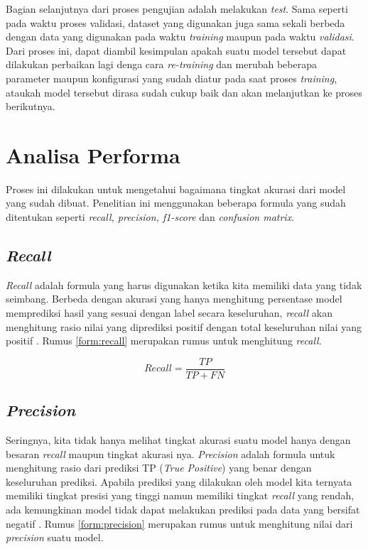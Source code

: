 Bagian selanjutnya dari proses pengujian adalah melakukan \textit{test}. Sama seperti pada waktu proses validasi, dataset yang digunakan juga sama sekali berbeda dengan data yang digunakan pada waktu \textit{training} maupun pada waktu \textit{validasi}. Dari proses ini, dapat diambil kesimpulan apakah suatu model tersebut dapat dilakukan perbaikan lagi denga cara \textit{re-training} dan merubah beberapa parameter maupun konfigurasi yang sudah diatur pada saat proses \textit{training}, ataukah model tersebut dirasa sudah cukup baik dan akan melanjutkan ke proses berikutnya.

\section{Analisa Performa}
Proses ini dilakukan untuk mengetahui bagaimana tingkat akurasi dari model yang sudah dibuat. Penelitian ini menggunakan beberapa formula yang sudah ditentukan seperti \textit{recall, precision, f1-score} dan \textit{confusion matrix}.

\subsection{\textit{Recall}}

\textit{Recall} adalah formula yang harus digunakan ketika kita memiliki data yang tidak seimbang. Berbeda dengan akurasi yang hanya menghitung persentase model memprediksi hasil yang sesuai dengan label secara keseluruhan, \textit{recall} akan menghitung rasio nilai yang diprediksi positif dengan total keseluruhan nilai yang positif \cite{metrics_ml}. Rumus \ref{form:recall} merupakan rumus untuk menghitung \textit{recall}.

\begin{equation}
  Recall = \frac{TP}{TP+FN}
  \label{form:recall}
\end{equation}

\subsection{\textit{Precision}}

Seringnya, kita tidak hanya melihat tingkat akurasi suatu model hanya dengan besaran \textit{recall} maupun tingkat akurasi nya. \textit{Precision} adalah formula untuk menghitung rasio dari prediksi TP (\textit{True Positive}) yang benar dengan keseluruhan prediksi. Apabila prediksi yang dilakukan oleh model kita ternyata memiliki tingkat presisi yang tinggi namun memiliki tingkat \textit{recall} yang rendah, ada kemungkinan model tidak dapat melakukan prediksi pada data yang bersifat negatif \cite{metrics_ml}. Rumus \ref{form:precision} merupakan rumus untuk menghitung nilai dari \textit{precision} suatu model.

